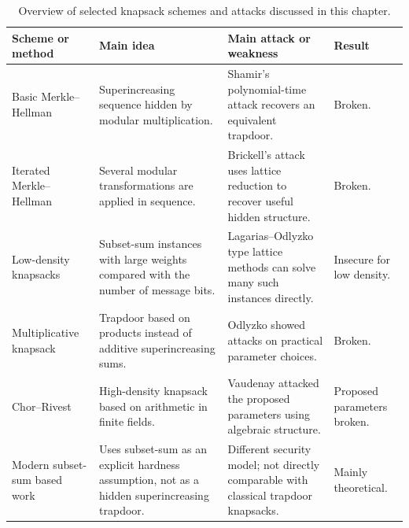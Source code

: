 \begin{table}[htbp]
\centering
\scriptsize
\setlength{\tabcolsep}{3pt}
\renewcommand{\arraystretch}{1.25}

\begin{tabular}{|>{\raggedright\arraybackslash}p{}|>{\raggedright\arraybackslash}p{}|>{\raggedright\arraybackslash}p{}|>{\raggedright\arraybackslash}p{}|}
\hline
\textbf{Scheme or method} &
\textbf{Main idea} &
\textbf{Main attack or weakness} &
\textbf{Result} \\
\hline

Basic Merkle--Hellman &
Superincreasing sequence hidden by modular multiplication. &
Shamir's polynomial-time attack recovers an equivalent trapdoor. &
Broken. \\
\hline

Iterated Merkle--Hellman &
Several modular transformations are applied in sequence. &
Brickell's attack uses lattice reduction to recover useful hidden structure. &
Broken. \\
\hline

Low-density knapsacks &
Subset-sum instances with large weights compared with the number of message bits. &
Lagarias--Odlyzko type lattice methods can solve many such instances directly. &
Insecure for low density. \\
\hline

Multiplicative knapsack &
Trapdoor based on products instead of additive superincreasing sums. &
Odlyzko showed attacks on practical parameter choices. &
Broken. \\
\hline

Chor--Rivest &
High-density knapsack based on arithmetic in finite fields. &
Vaudenay attacked the proposed parameters using algebraic structure. &
Proposed parameters broken. \\
\hline

Modern subset-sum based work &
Uses subset-sum as an explicit hardness assumption, not as a hidden superincreasing trapdoor. &
Different security model; not directly comparable with classical trapdoor knapsacks. &
Mainly theoretical. \\
\hline

\end{tabular}

\caption{Overview of selected knapsack schemes and attacks discussed in this chapter.}
\label{tab:schemes-attacks}
\end{table}
